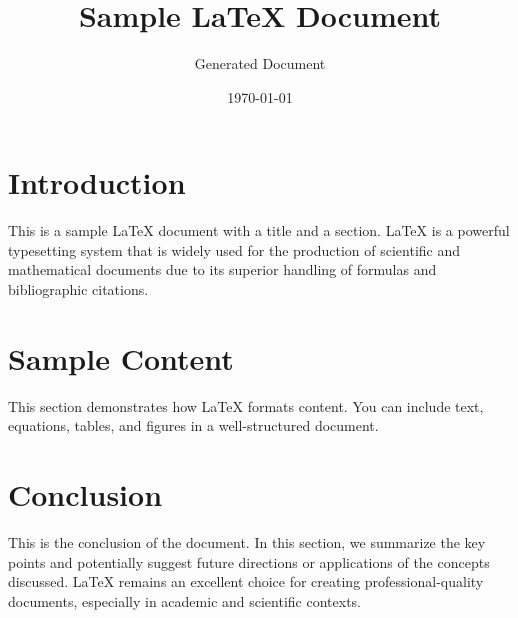 \documentclass{article}
\title{Sample LaTeX Document}
\author{Generated Document}
\date{\today}
\begin{document}
\maketitle

\section{Introduction}
This is a sample LaTeX document with a title and a section. LaTeX is a powerful typesetting system that is widely used for the production of scientific and mathematical documents due to its superior handling of formulas and bibliographic citations.

\section{Sample Content}
This section demonstrates how LaTeX formats content. You can include text, equations, tables, and figures in a well-structured document.

\section{Conclusion}
This is the conclusion of the document. In this section, we summarize the key points and potentially suggest future directions or applications of the concepts discussed. LaTeX remains an excellent choice for creating professional-quality documents, especially in academic and scientific contexts.
\end{document}
